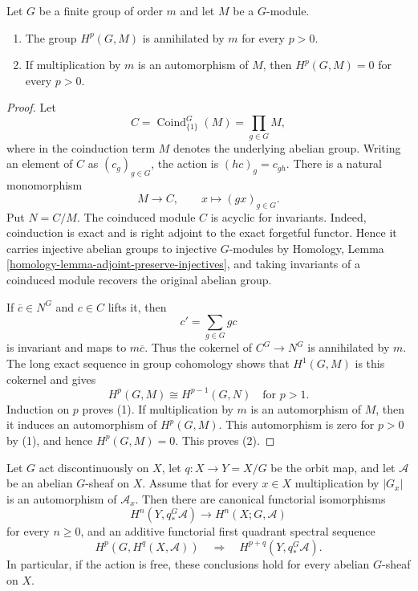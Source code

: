 \begin{lemma}
\label{lemma-finite-group-cohomology-invertible-order}
Let $G$ be a finite group of order $m$ and let $M$ be a $G$-module.
\begin{enumerate}
\item The group $H^p(G, M)$ is annihilated by $m$ for every $p>0$.
\item If multiplication by $m$ is an automorphism of $M$, then
$H^p(G, M)=0$ for every $p>0$.
\end{enumerate}
\end{lemma}

\begin{proof}
Let
$$
C = \operatorname{Coind}_{\{1\}}^G(M) = \prod_{g \in G} M,
$$
where in the coinduction term $M$ denotes the underlying abelian group.
Writing an element of $C$ as $(c_g)_{g \in G}$, the action is
$(h c)_g = c_{gh}$. There is a natural monomorphism
$$
M \longrightarrow C, \qquad x \longmapsto (g x)_{g \in G}.
$$
Put $N=C/M$. The coinduced module $C$ is acyclic for invariants. Indeed,
coinduction is exact and is right adjoint to the exact forgetful functor.
Hence it carries injective abelian groups to injective $G$-modules by
Homology, Lemma
\ref{homology-lemma-adjoint-preserve-injectives}, and taking invariants of a
coinduced module recovers the original abelian group.

If $\overline{c} \in N^G$ and $c \in C$ lifts it, then
$$
c' = \sum_{g \in G}gc
$$
is invariant and maps to $m\overline{c}$. Thus the cokernel of
$C^G\to N^G$ is annihilated by $m$. The long exact sequence in group
cohomology shows that $H^1(G,M)$ is this cokernel and gives
$$
H^p(G,M) \cong H^{p-1}(G,N) \quad\text{for }p>1.
$$
Induction on $p$ proves (1). If multiplication by $m$ is an automorphism of
$M$, then it induces an automorphism of $H^p(G,M)$. This automorphism is zero
for $p>0$ by (1), and hence $H^p(G,M)=0$. This proves (2).
\end{proof}

\begin{lemma}
\label{lemma-orbit-space-equivariant-cohomology-stabilizer-orders}
\begin{reference}
\cite[Chapter V, \S 5.3, Corollaries 1 and 3, pp. 204--205]{Tohoku}
\end{reference}
Let $G$ act discontinuously on $X$, let $q : X \to Y=X/G$ be the orbit
map, and let $\mathcal{A}$ be an abelian $G$-sheaf on $X$. Assume that for
every $x \in X$ multiplication by $|G_x|$ is an automorphism of
$\mathcal{A}_x$. Then there are canonical functorial isomorphisms
$$
H^n(Y, q_*^G\mathcal{A})
\longrightarrow
H^n(X; G, \mathcal{A})
$$
for every $n \geq 0$,
and an additive functorial first quadrant spectral sequence
$$
H^p(G, H^q(X, \mathcal{A}))
\quad\Longrightarrow\quad
H^{p + q}(Y, q_*^G\mathcal{A}).
$$
In particular, if the action is free, these conclusions hold for every
abelian $G$-sheaf on $X$.
\end{lemma}

